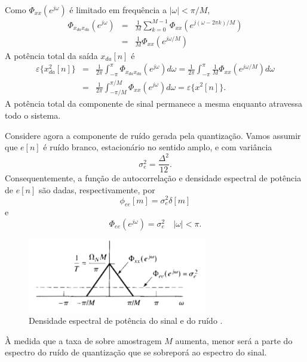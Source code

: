 \begin{frame}[allowframebreaks]
  Como $\Phi_{xx}(e^{j\omega})$ é limitado em frequência a $|\omega| < \pi/M$,
  \begin{eqnarray}
  \Phi_{x_{da} x_{da}} (e^{j\omega}) &=& \frac{1}{M} \sum_{k=0}^{M-1} \Phi_{xx} (e^{j(\omega - 2\pi k)/M}) \nonumber \\
                                     &=& \frac{1}{M} \Phi_{xx} (e^{j\omega /M})
  \end{eqnarray}
  A potência total da saída $x_{da}[n]$ é 
  \begin{eqnarray}
  \varepsilon\{x^2_{da}[n]\} &=& \frac{1}{2\pi} \int_{-\pi}^{\pi} \Phi_{x_{da} x_{da}} (e^{j \omega}) d\omega \nonumber = \frac{1}{2\pi} \int_{-\pi}^{\pi} \frac{1}{M} \Phi_{xx} (e^{j\omega/M}) d\omega \nonumber \\
                             &=& \frac{1}{2\pi} \int_{-\pi/M}^{\pi/M} \Phi_{xx} (e^{j\omega}) d\omega = \varepsilon\{x^2 [n]\} .
  \end{eqnarray}
  A potência total da componente de sinal permanece a mesma enquanto atravessa todo o sistema.

  \framebreak

  Considere agora a componente de ruído gerada pela quantização.
  Vamos assumir que $e[n]$ é ruído branco, estacionário no sentido amplo, e
  com variância 
  \begin{equation}
  \label{eq-variance-noise}
  \sigma_e^2 = \frac{\Delta^2}{12} .
  \end{equation}
  Consequentemente, a função de autocorrelação e densidade espectral de potência de $e[n]$
  são dadas, respectivamente, por
  \begin{equation}
  \label{eq-autocorr-noise}
  \phi_{ee} [m] = \sigma_e^2 \delta[m]
  \end{equation}
  e
  \begin{equation}
  \label{eq-power-density-noise}
  \Phi_{ee}(e^{j\omega}) = \sigma_e^2 \quad |\omega| < \pi .
  \end{equation}

  \framebreak

  \begin{figure}[h!]
  \centering
  \includegraphics[width=0.7\textwidth]{images/oppenheim_fig459.png}
  \caption{Densidade espectral de potência do sinal e do ruído \citep{oppenheim2009}.}
  \label{fig:oppenheim_fig459}
  \end{figure}
  À medida que a taxa de sobre amostragem $M$ aumenta, menor será a parte do espectro do ruído
  de quantização que se sobreporá ao espectro do sinal.


\end{frame}
